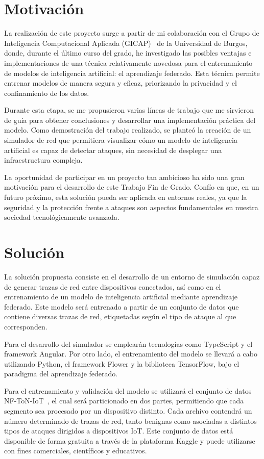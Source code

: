 \section{Motivación}
La realización de este proyecto surge a partir de mi colaboración con el Grupo de Inteligencia Computacional Aplicada (GICAP)~\cite{gicap} de la Universidad de Burgos, donde, durante el último curso del grado, he investigado las posibles ventajas e implementaciones de una técnica relativamente novedosa para el entrenamiento de modelos de inteligencia artificial: el aprendizaje federado. Esta técnica permite entrenar modelos de manera segura y eficaz, priorizando la privacidad y el confinamiento de los datos.

Durante esta etapa, se me propusieron varias líneas de trabajo que me sirvieron de guía para obtener conclusiones y desarrollar una implementación práctica del modelo. Como demostración del trabajo realizado, se planteó la creación de un simulador de red que permitiera visualizar cómo un modelo de inteligencia artificial es capaz de detectar ataques, sin necesidad de desplegar una infraestructura compleja.

La oportunidad de participar en un proyecto tan ambicioso ha sido una gran motivación para el desarrollo de este Trabajo Fin de Grado. Confío en que, en un futuro próximo, esta solución pueda ser aplicada en entornos reales, ya que la seguridad y la protección frente a ataques son aspectos fundamentales en nuestra sociedad tecnológicamente avanzada.

\section{Solución}
La solución propuesta consiste en el desarrollo de un entorno de simulación capaz de generar trazas de red entre dispositivos conectados, así como en el entrenamiento de un modelo de inteligencia artificial mediante aprendizaje federado. Este modelo será entrenado a partir de un conjunto de datos que contiene diversas trazas de red, etiquetadas según el tipo de ataque al que corresponden.

Para el desarrollo del simulador se emplearán tecnologías como TypeScript y el framework Angular. Por otro lado, el entrenamiento del modelo se llevará a cabo utilizando Python, el framework Flower y la biblioteca TensorFlow, bajo el paradigma del aprendizaje federado.

Para el entrenamiento y validación del modelo se utilizará el conjunto de datos NF-ToN-IoT~\cite{dataset}, el cual será particionado en dos partes, permitiendo que cada segmento sea procesado por un dispositivo distinto. Cada archivo contendrá un número determinado de trazas de red, tanto benignas como asociadas a distintos tipos de ataques dirigidos a dispositivos IoT. Este conjunto de datos está disponible de forma gratuita a través de la plataforma Kaggle y puede utilizarse con fines comerciales, científicos y educativos.


